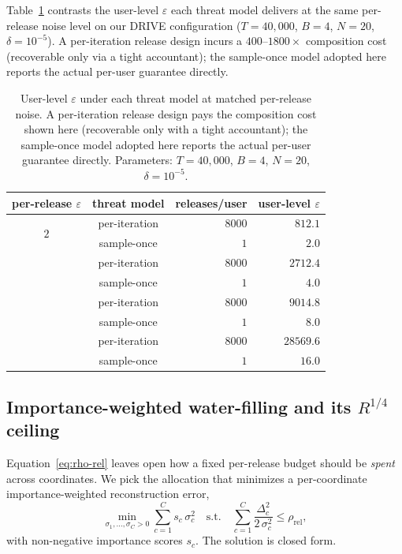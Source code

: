 Table~\ref{tab:privacy} contrasts the user-level $\varepsilon$ each
threat model delivers at the same per-release noise level on our DRIVE
configuration ($T{=}40{,}000$, $B{=}4$, $N{=}20$, $\delta{=}10^{-5}$).
A per-iteration release design incurs a $400$--$1800\times$ composition
cost (recoverable only via a tight accountant); the sample-once model
adopted here reports the actual per-user guarantee directly.

\begin{table}[t]
\centering
\small
\caption{User-level $\varepsilon$ under each threat model at matched
per-release noise. A per-iteration release design pays the composition
cost shown here (recoverable only with a tight accountant); the
sample-once model adopted here reports the actual per-user guarantee
directly. Parameters: $T{=}40{,}000$, $B{=}4$, $N{=}20$,
$\delta{=}10^{-5}$.}
\label{tab:privacy}
\begin{tabular}{c c r r}
\toprule
per-release $\varepsilon$ & threat model & releases/user & user-level $\varepsilon$ \\
\midrule
\multirow{2}{*}{$2$}  & per-iteration & $8000$ & $812.1$ \\
                      & sample-once   & $1$    & $2.0$   \\
\addlinespace[2pt]
\multirow{2}{*}{$4$}  & per-iteration & $8000$ & $2712.4$ \\
                      & sample-once   & $1$    & $4.0$    \\
\addlinespace[2pt]
\multirow{2}{*}{$8$}  & per-iteration & $8000$ & $9014.8$ \\
                      & sample-once   & $1$    & $8.0$    \\
\addlinespace[2pt]
\multirow{2}{*}{$16$} & per-iteration & $8000$ & $28569.6$ \\
                      & sample-once   & $1$    & $16.0$    \\
\bottomrule
\end{tabular}
\end{table}

\subsection{Importance-weighted water-filling and its $R^{1/4}$ ceiling}
\label{ssec:wf}

Equation~\eqref{eq:rho-rel} leaves open how a fixed per-release budget
should be \emph{spent} across coordinates. We pick the allocation
that minimizes a per-coordinate importance-weighted reconstruction
error,
\begin{equation}
\min_{\sigma_1,\ldots,\sigma_C > 0}
\sum_{c=1}^C s_c\,\sigma_c^{2}
\quad\text{s.t.}\quad
\sum_{c=1}^C\frac{\Delta_c^{2}}{2\,\sigma_c^{2}} \le \rho_{\mathrm{rel}},
\label{eq:opt}
\end{equation}
with non-negative importance scores $s_c$. The solution is closed
form.

